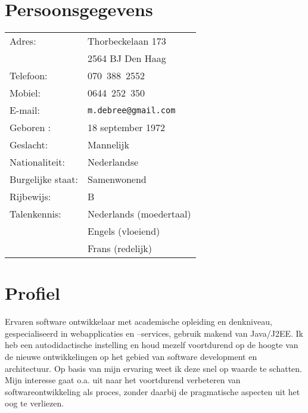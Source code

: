 \documentclass[a4paper]{article}
\author{\sffamily Michel de Bree}
\date{}
\begin{document}
{\maketitle}


\section*{Persoonsgegevens}	
		
    \begin{tabular}{l l}
        Adres: & Thorbeckelaan 173 \\
        & 2564 BJ  Den Haag \\
        Telefoon: & 070~388~2552 \\
        Mobiel: & 0644~252~350\\
        E-mail: & \texttt{m.debree@gmail.com} \\
        Geboren : & 18 september 1972 \\
        Geslacht: & Mannelijk \\
        Nationaliteit: & Nederlandse \\
        Burgelijke staat: & Samenwonend \\
        Rijbewijs: & B \\
        Talenkennis: & Nederlands (moedertaal) \\
        & Engels (vloeiend) \\
        & Frans (redelijk) \\
    \end{tabular}
            
\section*{Profiel}
Ervaren software ontwikkelaar met academische opleiding en denkniveau,
gespecialiseerd in web\-applicaties en --services, gebruik makend van Java/J2EE.
Ik heb een autodidactische instelling en houd mezelf voortdurend op de hoogte
van de nieuwe ontwikkelingen op het gebied van software development en
architectuur. Op basis van mijn ervaring weet ik deze snel op waarde te
schatten. Mijn interesse gaat o.a. uit naar het voortdurend verbeteren van
softwareontwikkeling als proces, zonder daarbij de pragmatische aspecten uit
het oog te verliezen.
\end{document}
